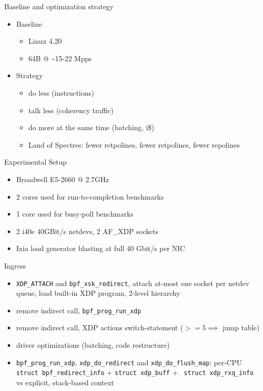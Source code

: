 \documentclass[aspectratio=169]{beamer}
\begin{document}
  \begin{frame}{Baseline and optimization strategy}
      \begin{itemize}
      \item Baseline
      \begin{itemize}
      \item Linux 4.20
      \item 64B @ \textasciitilde15-22 Mpps
      \end{itemize}

      \item Strategy
      \begin{itemize}
        \item do less (instructions)
        \item talk less (coherency traffic)
        \item do more at the same time (batching, i\$)
        \item Land of Spectres: fewer retpolines, fewer retpolines,
          fewer repolines
      \end{itemize}
      \end{itemize}
  \end{frame}

  \begin{frame}{Experimental Setup}
  \begin{itemize}
  \item Broadwell E5-2660 @ 2.7GHz
  \item 2 cores used for run-to-completion benchmarks
  \item 1 core used for busy-poll benchmarks
  \item 2 i40e 40GBit/s netdevs, 2 AF\_XDP sockets
  \item Ixia load generator blasting at full 40 Gbit/s per NIC
  \end{itemize}
  \end{frame}

  \begin{frame}{Ingress}
      \begin{itemize}
        \item {\tt XDP\_ATTACH} and {\tt bpf\_xsk\_redirect}, attach
          at-most one socket per netdev queue, load built-in XDP
          program, 2-level hierarchy
        \item remove indirect call, {\tt bpf\_prog\_run\_xdp}
        \item remove indirect call, XDP actions switch-statement ($>=5
          \implies$ jump table)
        \item driver optimizations (batching, code restructure)
        \item {\tt bpf\_prog\_run\_xdp}, {\tt xdp\_do\_redirect} and
          {\tt xdp\_do\_flush\_map}: per-CPU {\tt struct
            bpf\_redirect\_info} + {\tt struct xdp\_buff} + {\tt
            struct xdp\_rxq\_info} vs explicit, stack-based context
      \end{itemize}
  \end{frame}
\end{document}

